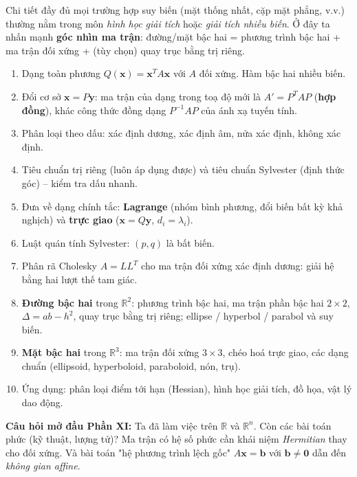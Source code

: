 \documentclass[12pt,a4paper]{article}
\begin{document}
\begin{luuy}
Chi tiết đầy đủ mọi trường hợp suy biến (mặt thống nhất, cặp mặt phẳng, v.v.) thường nằm trong môn \emph{hình học giải tích} hoặc \emph{giải tích nhiều biến}. Ở đây ta nhấn mạnh \textbf{góc nhìn ma trận}: đường/mặt bậc hai = phương trình bậc hai + ma trận đối xứng + (tùy chọn) quay trục bằng trị riêng.
\end{luuy}

\begin{tongket}[title={Tổng kết Phần X}]
\begin{enumerate}
  \item Dạng toàn phương $Q(\mathbf{x}) = \mathbf{x}^T A \mathbf{x}$ với $A$ đối xứng. Hàm bậc hai nhiều biến.
  \item Đổi cơ sở $\mathbf{x} = P\mathbf{y}$: ma trận của dạng trong toạ độ mới là $\boxed{A' = P^T A P}$ (\textbf{hợp đồng}), khác công thức đồng dạng $P^{-1}AP$ của ánh xạ tuyến tính.
  \item Phân loại theo dấu: xác định dương, xác định âm, nửa xác định, không xác định.
  \item Tiêu chuẩn trị riêng (luôn áp dụng được) và tiêu chuẩn Sylvester (định thức góc) -- kiểm tra dấu nhanh.
  \item Đưa về dạng chính tắc: \textbf{Lagrange} (nhóm bình phương, đổi biến bất kỳ khả nghịch) và \textbf{trực giao} ($\mathbf{x} = Q\mathbf{y}$, $d_i = \lambda_i$).
  \item Luật quán tính Sylvester: $(p, q)$ là bất biến.
  \item Phân rã Cholesky $A = LL^T$ cho ma trận đối xứng xác định dương: giải hệ bằng hai lượt thế tam giác.
  \item \textbf{Đường bậc hai} trong $\mathbb{R}^2$: phương trình bậc hai, ma trận phần bậc hai $2\times 2$, $\Delta = ab - h^2$, quay trục bằng trị riêng; ellipse / hyperbol / parabol và suy biến.
  \item \textbf{Mặt bậc hai} trong $\mathbb{R}^3$: ma trận đối xứng $3\times 3$, chéo hoá trực giao, các dạng chuẩn (ellipsoid, hyperboloid, paraboloid, nón, trụ).
  \item Ứng dụng: phân loại điểm tới hạn (Hessian), hình học giải tích, đồ họa, vật lý dao động.
\end{enumerate}

\textbf{Câu hỏi mở đầu Phần XI:} Ta đã làm việc trên $\mathbb{R}$ và $\mathbb{R}^n$. Còn các bài toán phức (kỹ thuật, lượng tử)? Ma trận có hệ số phức cần khái niệm \emph{Hermitian} thay cho đối xứng. Và bài toán "hệ phương trình lệch gốc" $A\mathbf{x} = \mathbf{b}$ với $\mathbf{b} \ne \mathbf{0}$ dẫn đến \emph{không gian affine}.
\end{tongket}
\end{document}

